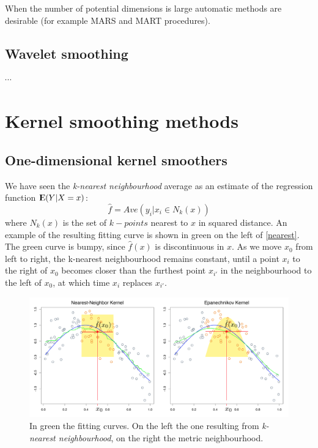 \documentclass[12pt, letterpaper]{article}
\theoremstyle{definition}
\newcommand{\E}{{\rm I\kern-.3em E}}
\begin{document}
When the number of potential dimensions is large automatic methods are desirable (for example MARS and MART procedures).
\subsection{Wavelet smoothing}
$\cdots$

\newpage
\section{Kernel smoothing methods}
\subsection{One-dimensional kernel smoothers}
We have seen the \textit{k-nearest neighbourhood} average as an estimate of the regression function $\E(Y|X=x)$:
\begin{equation}
\hat{f} = Ave(y_i|x_i\in N_k(x))
\end{equation}
where $N_k(x)$ is the set of $k-points$ nearest to $x$ in squared distance. An example of the resulting fitting curve is shown in green on the left of \autoref{nearest}. The green curve is bumpy, since $\hat{f}(x)$ is discontinuous in $x$. As we move $x_0$ from left to right, the k-nearest neighbourhood remains constant, until a point $x_i$ to the right of $x_0$ becomes closer than the furthest point $x_{i'}$ in the neighbourhood to the left of $x_0$, at which time $x_i$ replaces $x_{i'}$. 
\begin{figure}
\centering
\includegraphics[scale=0.38]{img/nearest}
\caption{In green the fitting curves. On the left the one resulting from \textit{k-nearest neighbourhood}, on the right the metric neighbourhood.}
\label{nearest}
\end{figure}
\end{document}
